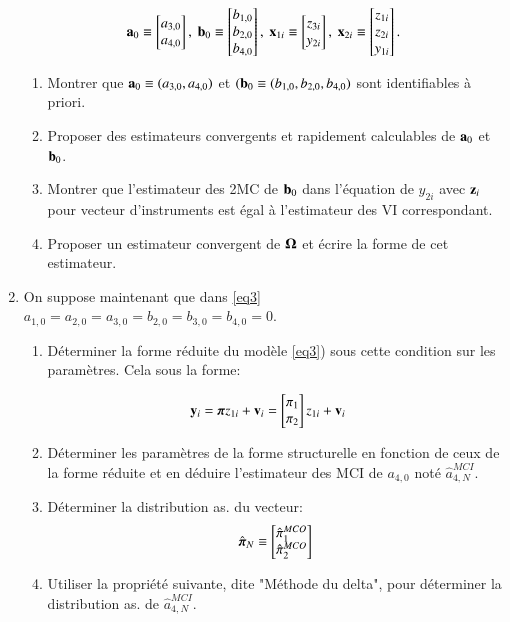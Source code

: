 \documentclass[10pt, reqno]{amsart}
\begin{document}
\begin{enumerate}
 \[
 \bolda_0 \equiv \begin{bmatrix}
    a_{3, 0}\\
    a_{4, 0}
 \end{bmatrix}
, \ 
\boldb_0 \equiv \begin{bmatrix}
    b_{1, 0}\\
    b_{2, 0}\\
    b_{4, 0}
 \end{bmatrix}
 , \ 
 \boldx_{1i} \equiv \begin{bmatrix}
    z_{3i}\\
    y_{2i}
 \end{bmatrix}
 , \ 
 \boldx_{2i} \equiv \begin{bmatrix}
    z_{1i}\\
    z_{2i}\\
    y_{1i}
 \end{bmatrix}.
 \]
 \begin{enumerate}
\item Montrer que ${\mathbf a}_0 \equiv (a_{3,0}, a_{4,0})$ et $({\mathbf b}_0 \equiv(b_{1,0},b_{2,0}, b_{4,0})$ sont 
identifiables à priori.
\item Proposer des estimateurs convergents et rapidement calculables de ${\mathbf a}_0$ et ${\mathbf b}_0$.
\item Montrer que l’estimateur des 2MC de ${\mathbf b}_0$ dans l’équation de $y_{2i}$ 
avec ${\mathbf z}_i$ pour vecteur d’instruments est égal à l’estimateur des VI correspondant. 
\item Proposer un estimateur convergent de ${\boldsymbol \Omega}$ et écrire la forme de cet estimateur.
 \end{enumerate}
 \item On suppose maintenant que dans \eqref{eq3} $a_{1,0} = a_{2,0}= a_{3,0}= b_{2,0}= b_{3,0}= b_{4,0}=0$.
\begin{enumerate}
\item Déterminer la forme réduite du modèle \eqref{eq3}) sous cette condition sur les paramètres. Cela sous la forme: 

\begin{align*}
 {\mathbf y}_i &= {\boldsymbol \pi} z_{1i} + {\mathbf v}_i = \begin{bmatrix}
     \pi_1\\
     \pi_2
 \end{bmatrix}
 z_{1i}+ {\mathbf v}_i
\end{align*}
\item Déterminer les paramètres de la forme structurelle en fonction de ceux de la forme réduite 
et en déduire l’estimateur des MCI de $a_{4, 0}$ noté $\hat{a}_{4, N}^{MCI}$.
\item Déterminer la distribution as. du vecteur:
\[\hat{{\boldsymbol \pi}}_N \equiv
    \begin{bmatrix}
        \hat{\pi}_1^{MCO}\\
        \hat{\pi}_2^{MCO}
    \end{bmatrix}
    \]
    \item Utiliser la propriété suivante, dite "Méthode du delta", pour déterminer la distribution as. de
    $\hat{a}_{4, N}^{MCI}$.


\end{enumerate}
\end{enumerate}
\end{document}
